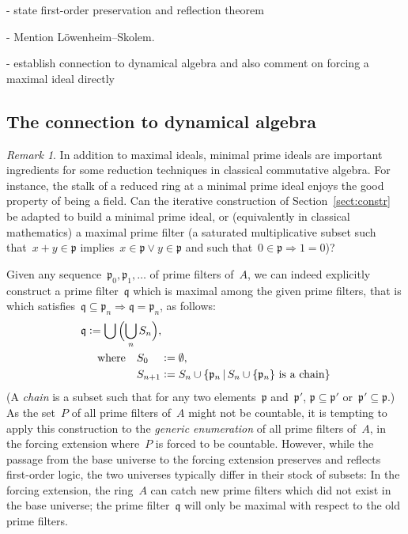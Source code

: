 \documentclass[com,11pt,crcready]{iosart2x}
\theoremstyle{definition}
\theoremstyle{plain}
\theoremstyle{remark}
\newtheorem{remark}[definition]{Remark}
\newcommand{\?}{\,{:}\,}
\newcommand{\ppp}{\mathfrak{p}}
\newcommand{\qqq}{\mathfrak{q}}
\newcommand{\defeq}{\vcentcolon=}
\renewcommand{\_}{\mathpunct{.}\,}
\begin{document}
\color{gray}

- state first-order preservation and reflection theorem

- Mention
  Löwenheim--Skolem.

- establish connection to dynamical algebra and also comment on
  forcing a maximal ideal directly

\subsection{The connection to dynamical algebra}

\begin{remark}In addition to maximal ideals, minimal prime ideals are important
ingredients for some reduction techniques in classical commutative algebra. For
instance, the stalk of a reduced ring at a minimal prime ideal enjoys the good
property of being a field. Can the iterative construction of Section~\ref{sect:constr} be adapted to
build a minimal prime ideal, or (equivalently in classical mathematics) a maximal prime
filter (a saturated multiplicative subset such that~$x + y \in \ppp$
implies~$x \in \ppp \vee y \in \ppp$ and such that~$0 \in \ppp \Rightarrow 1 = 0$)?

Given any sequence~$\ppp_0,\ppp_1,\ldots$ of prime filters of~$A$, we can indeed
explicitly construct a prime filter~$\qqq$ which is maximal among the given
prime filters, that is which satisfies~$\qqq \subseteq \ppp_n \Rightarrow \qqq
= \ppp_n$, as follows:
\begin{align*}
  \qqq &\defeq \bigcup\,\Bigl(\bigcup_n S_n\Bigr), \\
  &\quad\text{where}\quad S_{0\phantom{{}+n}} \defeq \emptyset, \\
  &\quad\phantom{\text{where}\quad} S_{n+1} \defeq S_n \cup \{ \ppp_n \,|\,
  \text{$S_n \cup \{\ppp_n\}$ is a chain} \}
\end{align*}
(A \emph{chain} is a subset such that for any two elements~$\ppp$ and~$\ppp'$,
$\ppp \subseteq \ppp'$ or~$\ppp' \subseteq \ppp$.) As the set~$P$ of all prime
filters of~$A$ might not be countable, it is tempting to apply this
construction to the \emph{generic enumeration} of all prime filters of~$A$,
in the forcing extension where~$P$ is forced to be countable. However,
while the passage from the base universe to the forcing extension preserves and
reflects first-order logic, the two universes typically differ in their stock
of subsets: In the forcing extension, the ring~$A$ can catch new prime filters
which did not exist in the base universe; the prime filter~$\qqq$ will only be
maximal with respect to the old prime filters.
\end{remark}
\end{document}
